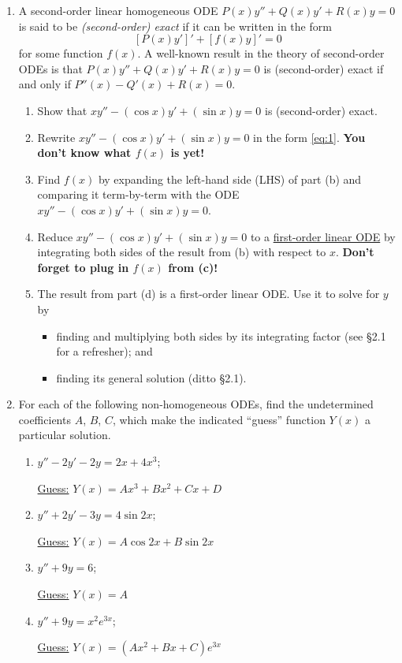\documentclass[12pt]{article}
\begin{document}
\begin{enumerate}
		\item A second-order linear homogeneous ODE $P(x)y''+Q(x)y'+R(x)y=0$ is said to be \textit{(second-order) exact} if it can be written in the form
		\begin{equation}
			\label{eq:1}[P(x)y']'+[f(x)y]'=0
		\end{equation}
		for some function $f(x)$. A well-known result in the theory of second-order ODEs is that $P(x)y''+Q(x)y'+R(x)y=0$ is (second-order) exact if and only if $P''(x)-Q'(x)+R(x)=0$.
		\begin{enumerate}[itemsep=0.5in]
			\item Show that $xy''-(\cos{x})y'+(\sin{x})y=0$ is (second-order) exact.
			\item Rewrite $xy''-(\cos{x})y'+(\sin{x})y=0$ in the form \eqref{eq:1}. \textbf{You don't know what $f(x)$ is yet!}
			\item Find $f(x)$ by expanding the left-hand side (LHS) of part (b) and comparing it term-by-term with the ODE $xy''-(\cos{x})y'+(\sin{x})y=0$.
			\item Reduce $xy''-(\cos{x})y'+(\sin{x})y=0$ to a \ul{first-order linear ODE} by integrating both sides of the result from (b) with respect to $x$. \textbf{Don't forget to plug in $f(x)$ from (c)!}
			\item The result from part (d) is a first-order linear ODE. Use it to solve for $y$ by
			\begin{itemize}[label=$\circ$]
				\item finding and multiplying both sides by its integrating factor (see \S2.1 for a refresher); and
				\item finding its general solution (ditto \S2.1).
			\end{itemize}
		\end{enumerate}
		
		\newpage
		
		\item For each of the following non-homogeneous ODEs, find the undetermined coefficients $A$, $B$, $C$, \textellipsis which make the indicated ``guess'' function $Y(x)$ a particular solution.
		\begin{enumerate}[itemsep=1.125in]
			\item $y''-2y'-2y=2x+4x^3$;\par\ul{Guess:} $Y(x)=Ax^3+Bx^2+Cx+D$
			\item $y''+2y'-3y=4\sin{2x}$;\par\ul{Guess:} $Y(x)=A\cos{2x}+B\sin{2x}$
			\item $y''+9y=6$;\par\ul{Guess:} $Y(x)=A$
			\item $y''+9y=x^2e^{3x}$;\par\ul{Guess:} $Y(x)=(Ax^2+Bx+C)e^{3x}$
		\end{enumerate}
		

\end{enumerate}
\end{document}
